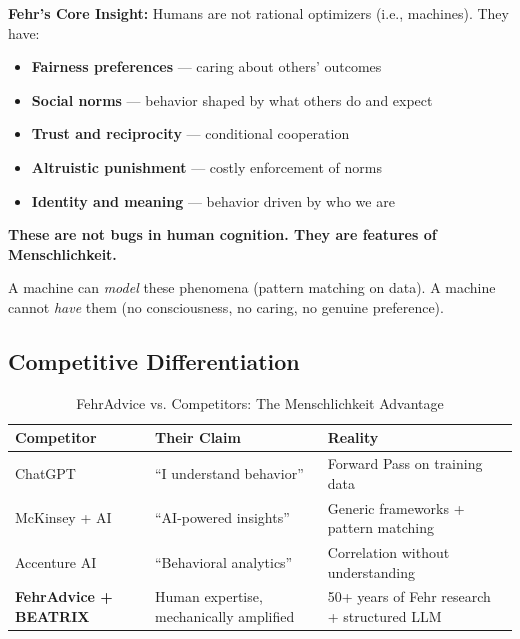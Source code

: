 \begin{tcolorbox}[colback=yellow!5!white, colframe=yellow!75!black]
\textbf{Fehr's Core Insight:} Humans are not rational optimizers (i.e., machines). They have:
\begin{itemize}[nosep]
    \item \textbf{Fairness preferences} --- caring about others' outcomes
    \item \textbf{Social norms} --- behavior shaped by what others do and expect
    \item \textbf{Trust and reciprocity} --- conditional cooperation
    \item \textbf{Altruistic punishment} --- costly enforcement of norms
    \item \textbf{Identity and meaning} --- behavior driven by who we are
\end{itemize}

\textbf{These are not bugs in human cognition. They are features of Menschlichkeit.}
\end{tcolorbox}

A machine can \textit{model} these phenomena (pattern matching on data). A machine cannot \textit{have} them (no consciousness, no caring, no genuine preference).

\subsection{Competitive Differentiation}

\begin{table}[htbp]
\centering
\caption{FehrAdvice vs. Competitors: The Menschlichkeit Advantage}
\renewcommand{\arraystretch}{1.4}
\begin{tabular}{@{}p{3cm}p{4cm}p{5cm}@{}}
\toprule
\textbf{Competitor} & \textbf{Their Claim} & \textbf{Reality} \\
\midrule
ChatGPT & ``I understand behavior'' & Forward Pass on training data \\
McKinsey + AI & ``AI-powered insights'' & Generic frameworks + pattern matching \\
Accenture AI & ``Behavioral analytics'' & Correlation without understanding \\
\midrule
\textbf{FehrAdvice + BEATRIX} & Human expertise, mechanically amplified & 50+ years of Fehr research + structured LLM \\
\bottomrule
\end{tabular}
\end{table}

